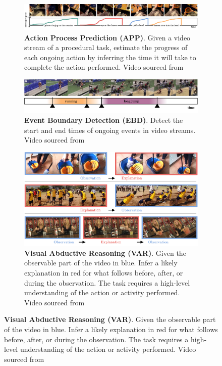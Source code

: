 \documentclass[smallextended,twocolumn,natbib]{svjour3}
\begin{document}
\begin{figure}[t]
\centering
\begin{subfigure}[b]{\textwidth}
\centering
\includegraphics[width=\textwidth]{figs/states/states-action_progress.pdf}
\caption{\textbf{Action Process Prediction (APP)}. Given a video stream of a procedural task, estimate the progress of each ongoing action by inferring the time it will take to complete the action performed. Video sourced from \citep{grauman2024ego} \vspace{1em}}
\label{fig:states::progress}
\end{subfigure}
\begin{minipage}{0.49\textwidth}
\begin{subfigure}{\linewidth}
\includegraphics[width=\linewidth]{figs/states/states-event_boundary.pdf}
\caption{\textbf{Event Boundary Detection (EBD)}. Detect the start and end times of ongoing events in video streams. Video sourced from \citep{carreira2017quo} \vspace{1em}}
\label{fig:states::boundary}
\end{subfigure}
\hfill
\addtocounter{subfigure}{1}
\begin{subfigure}{\linewidth}
\includegraphics[width=\linewidth]{figs/states/states-abductive reasoning.pdf}
\caption{\textbf{Visual Abductive Reasoning (VAR)}. Given the observable part of the video in \textcolor{babyblue}{blue}. Infer a likely explanation in \textcolor{fadedred}{red} for what follows before, after, or during the observation. The task requires a high-level understanding of the action or activity performed. Video sourced from \citep{liang2022visual} \vspace{1em}}

\end{subfigure}
\end{minipage}
\end{figure}
\end{document}

